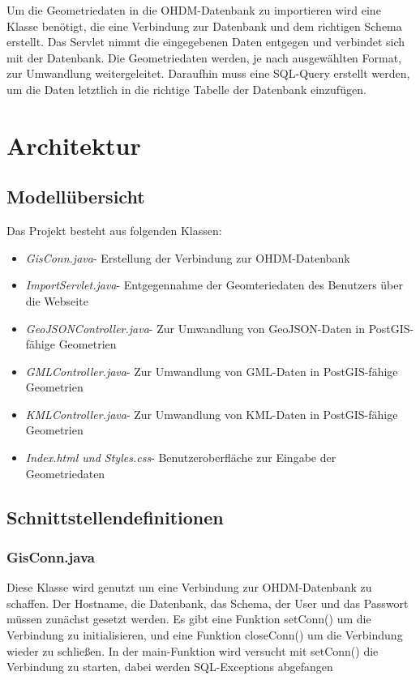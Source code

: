 \documentclass[]{article}
\begin{document}
Um die Geometriedaten in die OHDM-Datenbank zu importieren wird eine Klasse benötigt, die eine Verbindung zur Datenbank und dem richtigen Schema erstellt. Das Servlet nimmt die eingegebenen Daten entgegen und verbindet sich mit der Datenbank. Die Geometriedaten werden, je nach ausgewählten Format, zur Umwandlung weitergeleitet. Daraufhin muss eine SQL-Query erstellt werden, um die Daten letztlich in die richtige Tabelle der Datenbank einzufügen.

\section{Architektur}
\subsection{Modellübersicht}
Das Projekt besteht aus folgenden Klassen:
\begin{itemize}
	\item \textit{GisConn.java}- Erstellung der Verbindung zur OHDM-Datenbank
	\item \textit{ImportServlet.java}- Entgegennahme der Geomteriedaten des Benutzers über die Webseite
	\item \textit{GeoJSONController.java}- Zur Umwandlung von GeoJSON-Daten in PostGIS-fähige Geometrien
	\item \textit{GMLController.java}- Zur Umwandlung von GML-Daten in PostGIS-fähige Geometrien
	\item \textit{KMLController.java}- Zur Umwandlung von KML-Daten in PostGIS-fähige Geometrien
	\newline
	\item \textit{Index.html und Styles.css}- Benutzeroberfläche zur Eingabe der Geometriedaten
\end{itemize}

\subsection{Schnittstellendefinitionen}
\subsubsection{GisConn.java}
Diese Klasse wird genutzt um eine Verbindung zur OHDM-Datenbank zu schaffen. Der Hostname, die Datenbank, das Schema, der User und das Passwort müssen zunächst gesetzt werden. Es gibt eine Funktion setConn() um die Verbindung zu initialisieren, und eine Funktion closeConn() um die Verbindung wieder zu schließen. In der main-Funktion wird versucht mit setConn() die Verbindung zu starten, dabei werden SQL-Exceptions abgefangen
\end{document}
